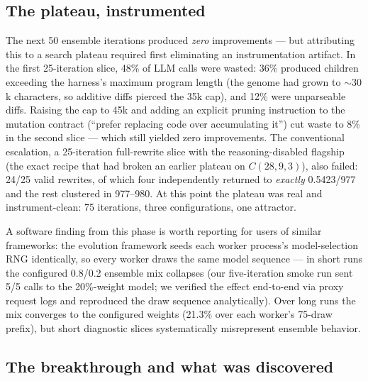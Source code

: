 \subsection{The plateau, instrumented}

The next 50 ensemble iterations produced \emph{zero}
improvements --- but attributing this to a search plateau required
first eliminating an instrumentation artifact. In the first
25-iteration slice, 48\% of LLM calls were wasted: 36\% produced
children exceeding the harness's maximum program length (the genome
had grown to ${\sim}30$k characters, so additive diffs pierced the
35k cap), and 12\% were unparseable diffs. Raising the cap to 45k
and adding an explicit pruning instruction to the mutation contract
(``prefer replacing code over accumulating it'') cut waste to 8\% in
the second slice --- which still yielded zero improvements. The
conventional escalation, a 25-iteration full-rewrite slice with the
reasoning-disabled flagship (the exact recipe that had broken an
earlier plateau on $C(28,9,3)$), also failed: 24/25 valid rewrites,
of which four independently returned to \emph{exactly} 0.5423/977
and the rest clustered in 977--980. At this point the plateau was
real and instrument-clean: 75 iterations, three configurations, one
attractor.

A software finding from this phase is worth reporting for users of
similar frameworks: the evolution framework seeds each worker
process's model-selection RNG identically, so every worker draws the
same model sequence --- in short runs the configured 0.8/0.2 ensemble
mix collapses (our five-iteration smoke run sent 5/5 calls to the
20\%-weight model; we verified the effect end-to-end via proxy
request logs and reproduced the draw sequence analytically). Over
long runs the mix converges to the configured weights (21.3\% over
each worker's 75-draw prefix), but short diagnostic slices
systematically misrepresent ensemble behavior.

\subsection{The breakthrough and what was discovered}

